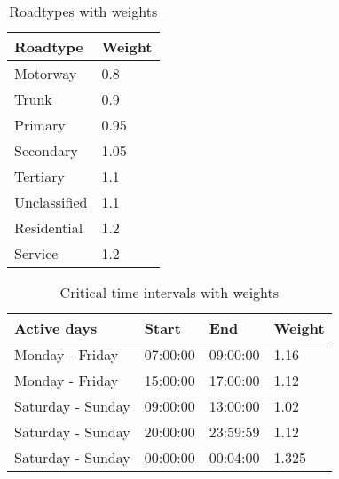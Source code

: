 \begin{table}
    \centering
    \begin{tabular}{|ll|}
    \hline
    \rowcolor{tablegreen}
    \textbf{Roadtype} & \textbf{Weight} \\ \hline
    Motorway          & 0.8               \\
    Trunk             & 0.9               \\
    Primary           & 0.95               \\
    Secondary         & 1.05            \\
    Tertiary          & 1.1             \\
    Unclassified      & 1.1             \\
    Residential       & 1.2             \\
    Service           & 1.2             \\ \hline
    \end{tabular}
    \caption{Roadtypes with weights}
    \label{tab:roadtypevalues}
\end{table}

\begin{table}
    \centering
    \begin{tabular}{|llll|}
    \hline
    \rowcolor{tablegreen}
    \textbf{Active days} & \textbf{Start} & \textbf{End} & \textbf{Weight} \\ \hline
    Monday - Friday      & 07:00:00       & 09:00:00     & 1.16             \\
    Monday - Friday      & 15:00:00       & 17:00:00     & 1.12            \\
    Saturday - Sunday    & 09:00:00       & 13:00:00     & 1.02           \\
    Saturday - Sunday    & 20:00:00       & 23:59:59     & 1.12            \\
    Saturday - Sunday    & 00:00:00       & 00:04:00     & 1.325             \\\hline
    \end{tabular}
    \caption{Critical time intervals with weights}
    \label{tab:crittimevalues}
\end{table}

